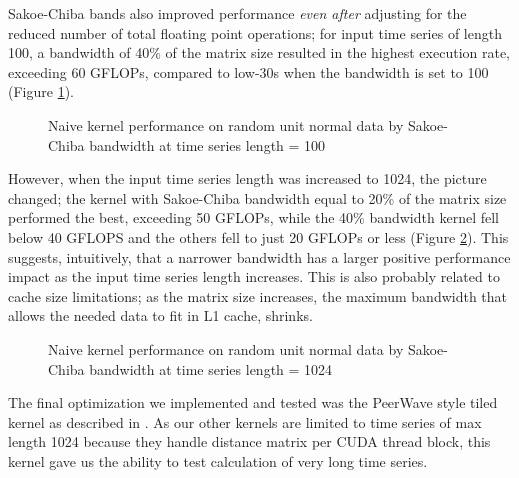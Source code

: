 \documentclass[12pt, letterpaper]{article}
\begin{document}
Sakoe-Chiba bands also improved performance \emph{even after} adjusting for the
reduced number of total floating point operations; for input time series of
length 100, a bandwidth of 40\% of the matrix size resulted in the highest
execution rate, exceeding 60 GFLOPs, compared to low-30s when the bandwidth is
set to 100 (Figure \ref{plot_bw}).

\begin{figure}[htbp]
    \begin{center}
        \scalebox{0.85}{}
    \end{center}
    \caption{Naive kernel performance on random unit normal data by
      Sakoe-Chiba bandwidth at time series length = 100}
    \label{plot_bw}
\end{figure}

However, when the input time series length was increased to 1024, the picture
changed; the kernel with Sakoe-Chiba bandwidth equal to 20\% of the matrix size
performed the best, exceeding 50 GFLOPs, while the 40\% bandwidth kernel fell
below 40 GFLOPS and the others fell to just 20 GFLOPs or less (Figure
\ref{plot_bw_1024}). This suggests, intuitively, that a narrower bandwidth has a
larger positive performance impact as the input time series length increases.
This is also probably related to cache size limitations; as the matrix size
increases, the maximum bandwidth that allows the needed data to fit in L1 cache,
shrinks.

\begin{figure}[htbp]
    \begin{center}
        \scalebox{0.85}{}
    \end{center}
    \caption{Naive kernel performance on random unit normal data by
      Sakoe-Chiba bandwidth at time series length = 1024}
    \label{plot_bw_1024}
\end{figure}

The final optimization we implemented and tested was the PeerWave style tiled
kernel as described in \cite{belviranli_peerwave_2015}. As our other kernels are
limited to time series of max length 1024 because they handle distance matrix
per CUDA thread block, this kernel gave us the ability to test calculation of
very long time series.
\end{document}
